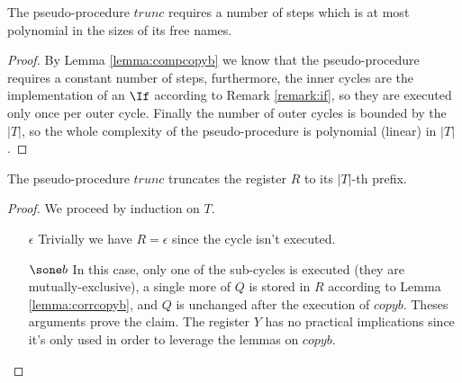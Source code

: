 \begin{lemma}
\label{lemma:comptrunc}
The pseudo-procedure $trunc$ requires a number of steps which is at most polynomial in the sizes of its free names.
\end{lemma}

\begin{proof}
By Lemma \ref{lemma:compcopyb} we know that the pseudo-procedure requires a constant number of steps, furthermore, the inner cycles are the implementation of an $\If$ according to Remark \ref{remark:if}, so they are executed only once per outer cycle. Finally the number of outer cycles is bounded by the $|T|$, so the whole complexity of the pseudo-procedure is polynomial (linear) in $|T|$.
\end{proof}

\begin{lemma}
\label{lemma:corrtrunc}
The pseudo-procedure $trunc$ truncates the register $R$ to its $|T|$-th prefix.
\end{lemma}

\begin{proof}
We proceed by induction on $T$.
\begin{itemize}
\item[$\epsilon$] Trivially we have $R=\epsilon$ since the cycle isn't executed.
\item[$\sone b$] In this case, only one of the sub-cycles is executed (they are mutually-exclusive), a single more of $Q$ is stored in $R$ according to Lemma \ref{lemma:corrcopyb}, and $Q$ is unchanged after the execution of $copyb$. Theses arguments prove the claim. The register $Y$ has no practical implications since it's only used in order to leverage the lemmas on $copyb$.
\end{itemize}
\end{proof}

